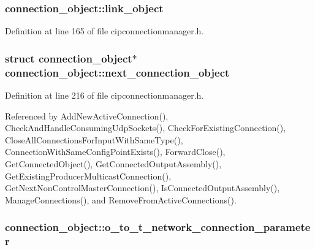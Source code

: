 \hypertarget{structconnection__object_a5166834835975a7e929324b18c630f6b}{
\subsubsection[{link\-\_\-object}]{ {\bf connection\-\_\-object\-::link\-\_\-object}}}\label{d1/d48/structconnection__object_a5166834835975a7e929324b18c630f6b}


\-Definition at line 165 of file cipconnectionmanager.\-h.

\hypertarget{structconnection__object_a490adc7536680841cb7542a7ed6cd829}{
\subsubsection[{next\-\_\-connection\-\_\-object}]{\setlength{\rightskip}{0pt plus 5cm}struct {\bf connection\-\_\-object}$\ast$ {\bf connection\-\_\-object\-::next\-\_\-connection\-\_\-object}}}\label{d1/d48/structconnection__object_a490adc7536680841cb7542a7ed6cd829}


\-Definition at line 216 of file cipconnectionmanager.\-h.



\-Referenced by \-Add\-New\-Active\-Connection(), \-Check\-And\-Handle\-Consuming\-Udp\-Sockets(), \-Check\-For\-Existing\-Connection(), \-Close\-All\-Connections\-For\-Input\-With\-Same\-Type(), \-Connection\-With\-Same\-Config\-Point\-Exists(), \-Forward\-Close(), \-Get\-Connected\-Object(), \-Get\-Connected\-Output\-Assembly(), \-Get\-Existing\-Producer\-Multicast\-Connection(), \-Get\-Next\-Non\-Control\-Master\-Connection(), \-Is\-Connected\-Output\-Assembly(), \-Manage\-Connections(), and \-Remove\-From\-Active\-Connections().

\hypertarget{structconnection__object_af1d980ce6b30a318e559cf32d23aa0ec}{
\subsubsection[{o\-\_\-to\-\_\-t\-\_\-network\-\_\-connection\-\_\-parameter}]{ {\bf connection\-\_\-object\-::o\-\_\-to\-\_\-t\-\_\-network\-\_\-connection\-\_\-parameter}}}\label{d1/d48/structconnection__object_af1d980ce6b30a318e559cf32d23aa0ec}


